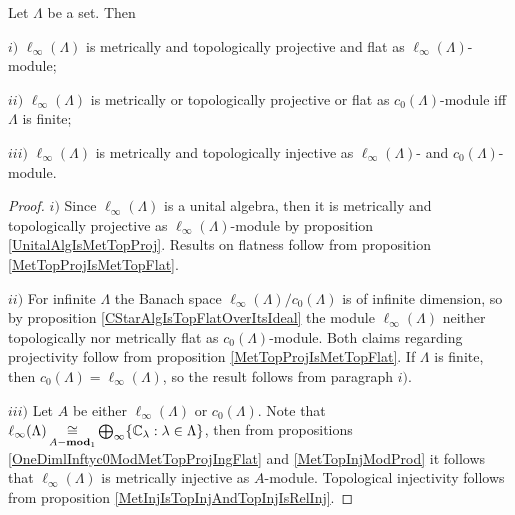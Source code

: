 \begin{proposition}\label{c0AndlInftyModlIfty} Let $\Lambda$ be a set. Then

$i)$ $\ell_\infty(\Lambda)$ is metrically and topologically projective and flat as $\ell_\infty(\Lambda)$-module;

$ii)$ $\ell_\infty(\Lambda)$ is metrically or topologically projective or flat as $c_0(\Lambda)$-module iff $\Lambda$ is finite;

$iii)$ $\ell_\infty(\Lambda)$ is metrically and topologically injective as $\ell_\infty(\Lambda)$- and $c_0(\Lambda)$-module.
\end{proposition}
\begin{proof} $i)$ Since $\ell_\infty(\Lambda)$ is a unital algebra, then it is metrically and topologically projective as $\ell_\infty(\Lambda)$-module by proposition \ref{UnitalAlgIsMetTopProj}. Results on flatness follow from proposition \ref{MetTopProjIsMetTopFlat}.

$ii)$ For infinite $\Lambda$ the Banach space $\ell_\infty(\Lambda)/c_0(\Lambda)$ is of infinite dimension, so by proposition \ref{CStarAlgIsTopFlatOverItsIdeal} the module $\ell_\infty(\Lambda)$ neither topologically nor metrically flat as $c_0(\Lambda)$-module. Both claims regarding projectivity follow from proposition \ref{MetTopProjIsMetTopFlat}. If $\Lambda$ is finite, then $c_0(\Lambda)=\ell_\infty(\Lambda)$, so the result follows from paragraph $i)$.

$iii)$ Let $A$ be either $\ell_\infty(\Lambda)$ or $c_0(\Lambda)$. Note that $\ell_\infty(\Lambda)\mathop{\mathbin{\cong}}\limits_{A-\mathbf{mod}_1}\bigoplus_\infty\{\mathbb{C}_\lambda:\lambda\in\Lambda\}$, then from propositions \ref{OneDimlInftyc0ModMetTopProjIngFlat} and \ref{MetTopInjModProd} it follows that $\ell_\infty(\Lambda)$ is metrically injective as $A$-module. Topological injectivity follows from proposition \ref{MetInjIsTopInjAndTopInjIsRelInj}.
\end{proof}

